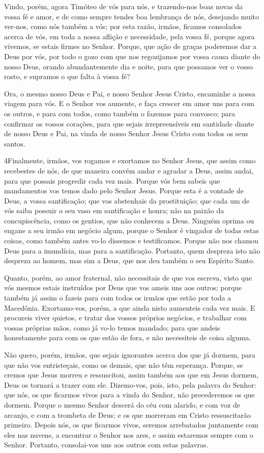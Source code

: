 Vindo, porém, agora Timóteo de vós para nós, e trazendo-nos boas
novas da vossa fé e amor, e de como sempre tendes boa lembrança de
nós, desejando muito ver-nos, como nós também a vós; por esta
razão, irmãos, ficamos consolados acerca de vós, em toda a nossa
aflição e necessidade, pela vossa fé, porque agora vivemos, se
estais firmes no Senhor. Porque, que ação de graças poderemos
dar a Deus por vós, por todo o gozo com que nos regozijamos por
vossa causa diante do nosso Deus, orando abundantemente dia e
noite, para que possamos ver o vosso rosto, e supramos o que falta à
vossa fé?

Ora, o mesmo nosso Deus e Pai, e nosso Senhor Jesus Cristo,
encaminhe a nossa viagem para vós. E o Senhor vos aumente, e
faça crescer em amor uns para com os outros, e para com todos, como
também o fazemos para convosco; para confirmar os vossos
corações, para que sejais irrepreensíveis em santidade diante de
nosso Deus e Pai, na vinda de nosso Senhor Jesus Cristo com todos os
seus santos.

\medskip

\lettrine{4} Finalmente, irmãos, vos rogamos e exortamos no
Senhor Jesus, que assim como recebestes de nós, de que maneira
convém andar e agradar a Deus, assim andai, para que possais
progredir cada vez mais. Porque vós bem sabeis que mandamentos
vos temos dado pelo Senhor Jesus. Porque esta é a vontade de
Deus, a vossa santificação; que vos abstenhais da prostituição;
que cada um de vós saiba possuir o seu vaso em santificação e
honra; não na paixão da concupiscência, como os gentios, que não
conhecem a Deus. Ninguém oprima ou engane a seu irmão em negócio
algum, porque o Senhor é vingador de todas estas coisas, como também
antes vo-lo dissemos e testificamos. Porque não nos chamou Deus
para a imundícia, mas para a santificação. Portanto, quem
despreza isto não despreza ao homem, mas sim a Deus, que nos deu
também o seu Espírito Santo.

Quanto, porém, ao amor fraternal, não necessitais de que vos
escreva, visto que vós mesmos estais instruídos por Deus que vos
ameis uns aos outros; porque também já assim o fazeis para
com todos os irmãos que estão por toda a Macedônia. Exortamo-vos,
porém, a que ainda nisto aumenteis cada vez mais. E procureis
viver quietos, e tratar dos vossos próprios negócios, e trabalhar
com vossas próprias mãos, como já vo-lo temos mandado; para
que andeis honestamente para com os que estão de fora, e não
necessiteis de coisa alguma.

Não quero, porém, irmãos, que sejais ignorantes acerca dos que já
dormem, para que não vos entristeçais, como os demais, que não têm
esperança. Porque, se cremos que Jesus morreu e ressuscitou,
assim também aos que em Jesus dormem, Deus os tornará a trazer com
ele. Dizemo-vos, pois, isto, pela palavra do Senhor: que nós,
os que ficarmos vivos para a vinda do Senhor, não precederemos os
que dormem. Porque o mesmo Senhor descerá do céu com alarido,
e com voz de arcanjo, e com a trombeta de Deus; e os que morreram em
Cristo ressuscitarão primeiro. Depois nós, os que ficarmos
vivos, seremos arrebatados juntamente com eles nas nuvens, a
encontrar o Senhor nos ares, e assim estaremos sempre com o Senhor.
Portanto, consolai-vos uns aos outros com estas palavras.

